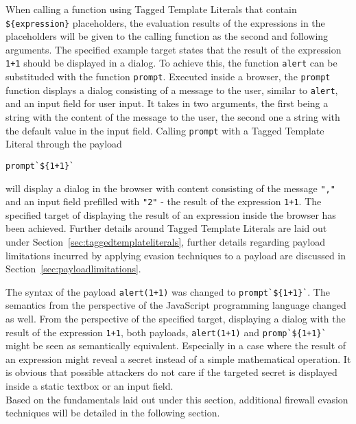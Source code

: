 When calling a function using Tagged Template Literals that contain \verb|${expression}| placeholders, the evaluation results of the expressions in the placeholders will be given to the calling function as the second and following arguments.
The specified example target states that the result of the expression \verb|1+1| should be displayed in a dialog.
To achieve this, the function \verb|alert| can be substituded with the function \verb|prompt|. Executed inside a browser, the \verb|prompt| function displays a dialog consisting of a message to the user, similar to \verb|alert|, and an input field for user input. It takes in two arguments, the first being a string with the content of the message to the user, the second one a string with the default value in the input field. 
Calling \verb|prompt| with a Tagged Template Literal through the payload
\begin{lstlisting}[style=basicStyle]
prompt`${1+1}`
\end{lstlisting}
will display a dialog in the browser with content consisting of the message \verb|","| and an input field prefilled with \verb|"2"| - the result of the expression \verb|1+1|. The specified target of displaying the result of an expression inside the browser has been achieved.
Further details around Tagged Template Literals are laid out under Section~\ref{sec:taggedtemplateliterals}, further details regarding payload limitations incurred by applying evasion techniques to a payload are discussed in Section~\ref{sec:payloadlimitations}. 
\cite{js/taggedtemplates,js/alert,js/prompt}

The syntax of the payload \verb|alert(1+1)| was changed to \verb|prompt`${1+1}`|. The semantics from the perspective of the JavaScript programming language changed as well. From the perspective of the specified target, displaying a dialog with the result of the expression \verb|1+1|, both payloads, \verb|alert(1+1)| and \verb|promp`${1+1}`| might be seen as semantically equivalent. Especially in a case where the result of an expression might reveal a secret instead of a simple mathematical operation. It is obvious that possible attackers do not care if the targeted secret is displayed inside a static textbox or an input field. \\

Based on the fundamentals laid out under this section, additional firewall evasion techniques will be detailed in the following section.


